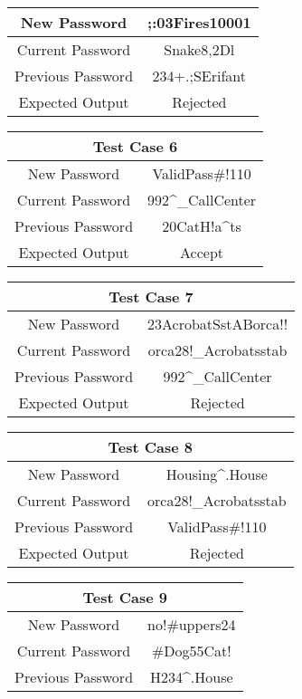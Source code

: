 \documentclass[12pt,letterpaper]{article}
\begin{document}
\begin{center}
\begin{tabular}{||c|c||}
  \hline
  New Password &  ;:03Fires10001 \\
  \hline
  Current Password & Snake8,2Dl \\
  \hline
  Previous Password & 234+.;SErifant \\
  \hline
  Expected Output & Rejected \\
  \hline
  \end{tabular}
  \vspace{1mm}
  \begin{tabular}{||c|c||}
  \hline
  \multicolumn{2}{||c||}{Test Case 6} \\
  \hline
  New Password &  ValidPass\#!110 \\
  \hline
  Current Password & 992\^{}\_CallCenter \\
  \hline
  Previous Password & 20CatH!a\^{}ts \\
  \hline
  Expected Output & Accept \\
  \hline
  \end{tabular}
  \begin{tabular}{||c|c||}
  \hline
  \multicolumn{2}{||c||}{Test Case 7} \\
  \hline
  New Password & 23AcrobatSstABorca!! \\
  \hline
  Current Password & orca28!\_Acrobatsstab \\
  \hline
  Previous Password & 992\^{}\_CallCenter \\
  \hline
  Expected Output & Rejected \\
  \hline
  \end{tabular}
  \vspace{1mm}
  \begin{tabular}{||c|c||}
  \hline
  \multicolumn{2}{||c||}{Test Case 8} \\
  \hline
  New Password & Housing\^{}.House \\
  \hline
  Current Password & orca28!\_Acrobatsstab \\
  \hline
  Previous Password & ValidPass\#!110 \\
  \hline
  Expected Output & Rejected \\
  \hline
  \end{tabular}
  \begin{tabular}{||c|c||}
  \hline
  \multicolumn{2}{||c||}{Test Case 9} \\
  \hline
  New Password & no!\#uppers24 \\
  \hline
  Current Password & \#Dog55Cat! \\
  \hline
  Previous Password & H234\^{}.House \\

\end{tabular}
\end{center}
\end{document}
